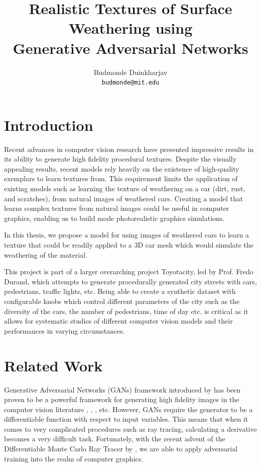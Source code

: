 \documentclass[letterpaper,doc,natbib]{apa6}
\title{Realistic Textures of Surface Weathering using\\
Generative Adversarial Networks}
\author{Budmonde Duinkharjav\\
{\tt\small budmonde@mit.edu}
}
\affiliation{Advised by Prof. Fredo Durand, CSAIL Computer Graphics Group\\
M.Eng Thesis Proposal, Fall 2018\\
Massachusetts Institute of Technology
}
\begin{document}
\maketitle

\section{Introduction}

Recent advances in computer vision research have presented impressive results in its ability to generate high fidelity procedural textures. Despite the visually appealing results, recent models rely heavily on the existence of high-quality exemplars to learn textures from. This requirement limits the application of existing models such as learning the texture of weathering on a car (dirt, rust, and scratches), from natural images of weathered cars. Creating a model that learns complex textures from natural images could be useful in computer graphics, enabling us to build mode photorealistic graphics simulations.

In this thesis, we propose a model for using images of weathered cars to learn a texture that could be readily applied to a 3D car mesh which would simulate the weathering of the material.

This project is part of a larger overarching project Toyotacity, led by Prof. Fredo Durand, which attempts to generate procedurally generated city streets with cars, pedestrians, traffic lights, etc. Being able to create a synthetic dataset with configurable knobs which control different parameters of the city such as the diversity of the cars, the number of pedestrians, time of day etc. is critical as it allows for systematic studies of different computer vision models and their performances in varying circumstances.

\section{Related Work}

Generative Adversarial Networks (GANs) framework introduced by \cite{gan} has been proven to be a powerful framework for generating high fidelity images in the computer vision literature \cite{pix2pix}, \cite{cyclegan}, \cite{texsyn}, etc. However, GANs require the generator to be a differentiable function with respect to input variables. This means that when it comes to very complicated procedures such as ray tracing, calculating a derivative becomes a very difficult task. Fortunately, with the recent advent of the Differentiable Monte Carlo Ray Tracer by \cite{dmc}, we are able to apply adversarial training into the realm of computer graphics.
\end{document}
